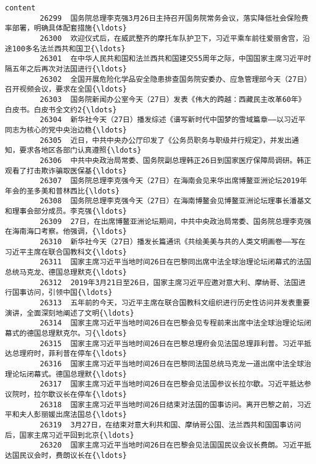 \documentclass[11pt]{article}
\begin{document}
\begin{Verbatim}[commandchars=\\\{\}]
                                                         content  
        26299  国务院总理李克强3月26日主持召开国务院常务会议，落实降低社会保险费率部署，明确具体配套措施{\ldots}  
        26300  欢迎仪式后，在威武整齐的摩托车队护卫下，习近平乘车前往爱丽舍宫，沿途100多名法兰西共和国卫{\ldots}  
        26301  在中华人民共和国和法兰西共和国建交55周年之际，中国国家主席习近平时隔五年之后再次对法国进行{\ldots}  
        26302  全国开展危险化学品安全隐患排查国务院安委办、应急管理部今天（27日）召开视频会议，要求在全国{\ldots}  
        26303  国务院新闻办公室今天（27日）发表《伟大的跨越：西藏民主改革60年》白皮书。白皮书全文约2{\ldots}  
        26304  新华社今天（27日）播发综述《谱写新时代中国梦的雪域篇章——以习近平同志为核心的党中央治边稳{\ldots}  
        26305  近日，中共中央办公厅印发了《公务员职务与职级并行规定》，并发出通知，要求各地区各部门认真遵照{\ldots}  
        26306  中共中央政治局常委、国务院副总理韩正26日到国家医疗保障局调研。韩正观看了打击欺诈骗取医保基{\ldots}  
        26307  国务院总理李克强今天（27日）在海南会见来华出席博鳌亚洲论坛2019年年会的圣多美和普林西比{\ldots}  
        26308  国务院总理李克强今天（27日）在海南博鳌会见博鳌亚洲论坛理事长潘基文和理事会部分成员。李克强{\ldots}  
        26309  27日，在出席博鳌亚洲论坛期间，中共中央政治局常委、国务院总理李克强在海南海口考察。他强调，{\ldots}  
        26310  新华社今天（27日）播发长篇通讯《共绘美美与共的人类文明画卷——写在习近平主席在联合国教科文{\ldots}  
        26311  国家主席习近平当地时间26日在巴黎同出席中法全球治理论坛闭幕式的法国总统马克龙、德国总理默克{\ldots}  
        26312  2019年3月21日至26日，国家主席习近平应邀对意大利、摩纳哥、法国进行国事访问，引领中国{\ldots}  
        26313  五年前的今天，习近平主席在联合国教科文组织进行历史性访问并发表重要演讲，全面深刻地阐述了文明{\ldots}  
        26314  国家主席习近平当地时间26日在巴黎会见专程前来出席中法全球治理论坛闭幕式的德国总理默克尔。习{\ldots}  
        26315  国家主席习近平当地时间26日在巴黎总理府会见法国总理菲利普。习近平抵达总理府时，菲利普在停车{\ldots}  
        26316  国家主席习近平当地时间26日在巴黎同法国总统马克龙一道出席中法全球治理论坛闭幕式。德国总理默{\ldots}  
        26317  国家主席习近平当地时间26日在巴黎会见法国参议长拉尔歇。习近平抵达参议院时，拉尔歇议长在停车{\ldots}  
        26318  国家主席习近平当地时间26日结束对法国的国事访问。离开巴黎之前，习近平和夫人彭丽媛出席法国总{\ldots}  
        26319  3月27日，在结束对意大利共和国、摩纳哥公国、法兰西共和国国事访问后，国家主席习近平回到北京{\ldots}  
        26320  国家主席习近平当地时间26日在巴黎会见法国国民议会议长费朗。习近平抵达国民议会时，费朗议长在{\ldots}  

\end{Verbatim}
\end{document}
